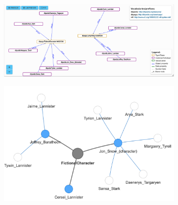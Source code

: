 \documentclass{article}
\begin{document}
\begin{figure}
     \centering
     \begin{subfigure}[b]{0.48\textwidth}
         \centering
         \includegraphics[width=\textwidth]{img/GotCharacters.png}
         \caption{}
         \label{fig:y equals x}
     \end{subfigure}
     \hfill
     \begin{subfigure}[b]{0.48\textwidth}
         \centering
         \includegraphics[width=\textwidth]{img/SemanticMapGot.png}
         \caption{}
         \label{fig:three sin x}
     \end{subfigure}
    \label{fig:three graphs}
\end{figure}
\end{document}
